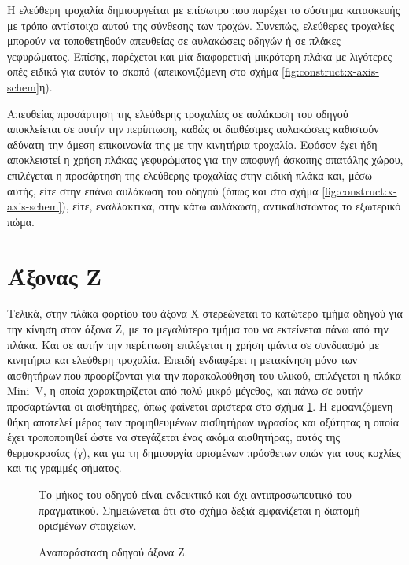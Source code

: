 Η ελεύθερη τροχαλία δημιουργείται με επίσωτρο που παρέχει το σύστημα κατασκευής
με τρόπο αντίστοιχο αυτού της σύνθεσης των τροχών. Συνεπώς, ελεύθερες τροχαλίες
μπορούν να τοποθετηθούν απευθείας σε αυλακώσεις οδηγών ή σε πλάκες γεφυρώματος.
Επίσης, παρέχεται και μία διαφορετική μικρότερη πλάκα με λιγότερες οπές ειδικά
για αυτόν το σκοπό (απεικονιζόμενη στο σχήμα \ref{fig:construct:x-axis-schem}η).

Απευθείας προσάρτηση της ελεύθερης τροχαλίας σε αυλάκωση του οδηγού αποκλείεται
σε αυτήν την περίπτωση, καθώς οι διαθέσιμες αυλακώσεις καθιστούν αδύνατη την
άμεση επικοινωνία της με την κινητήρια τροχαλία. Εφόσον έχει ήδη αποκλειστεί η
χρήση πλάκας γεφυρώματος για την αποφυγή άσκοπης σπατάλης χώρου, επιλέγεται η
προσάρτηση της ελεύθερης τροχαλίας στην ειδική πλάκα και, μέσω αυτής, είτε στην
επάνω αυλάκωση του οδηγού (όπως και στο σχήμα \ref{fig:construct:x-axis-schem}),
είτε, εναλλακτικά, στην κάτω αυλάκωση, αντικαθιστώντας το εξωτερικό πώμα.

\section{Άξονας Z}

\label{sec:construct:z-axis}
Τελικά, στην πλάκα φορτίου του άξονα X στερεώνεται το κατώτερο τμήμα οδηγού για
την κίνηση στον άξονα Z, με το μεγαλύτερο τμήμα του να εκτείνεται πάνω από την
πλάκα. Και σε αυτήν την περίπτωση επιλέγεται η χρήση ιμάντα σε συνδυασμό με
κινητήρια και ελεύθερη τροχαλία. Επειδή ενδιαφέρει η μετακίνηση μόνο των
αισθητήρων που προορίζονται για την παρακολούθηση του υλικού, επιλέγεται η πλάκα
Mini~V, η οποία χαρακτηρίζεται από πολύ μικρό μέγεθος, και πάνω σε αυτήν
προσαρτώνται οι αισθητήρες, όπως φαίνεται αριστερά στο σχήμα
\ref{fig:construct:z-axis}. Η εμφανιζόμενη θήκη αποτελεί μέρος των προμηθευμένων
αισθητήρων υγρασίας και οξύτητας η οποία έχει τροποποιηθεί ώστε να στεγάζεται
ένας ακόμα αισθητήρας, αυτός της θερμοκρασίας (γ), και για τη δημιουργία
ορισμένων πρόσθετων οπών για τους κοχλίες και τις γραμμές σήματος.

\begin{figure}
    \caption{Αναπαράσταση οδηγού άξονα Z. \label{fig:construct:z-axis}}
Το μήκος του οδηγού είναι ενδεικτικό και όχι αντιπροσωπευτικό του πραγματικού.
Σημειώνεται ότι στο σχήμα δεξιά εμφανίζεται η διατομή ορισμένων στοιχείων.
    \begin{center}%
    \def\svgwidth{0.5\textwidth}
    
    \end{center}
\end{figure}

